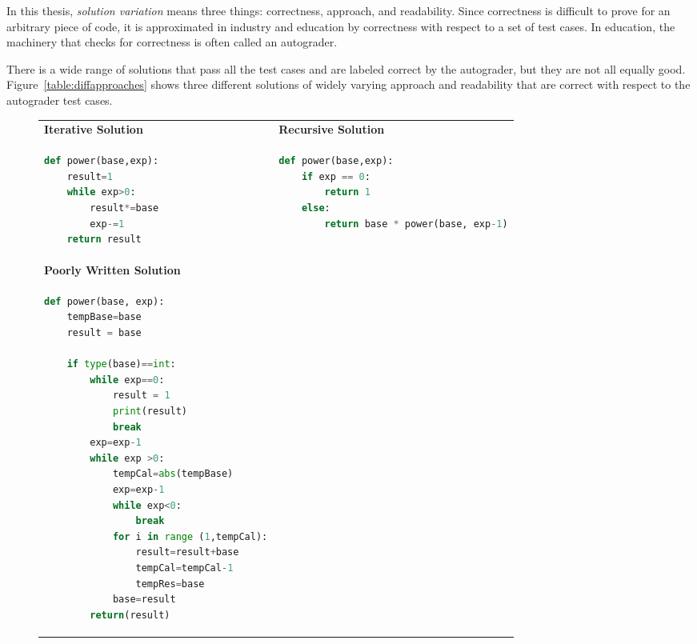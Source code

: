 In this thesis, {\it solution variation} means three things: correctness, approach, and readability. Since correctness is difficult to prove for an arbitrary piece of code, it is approximated in industry and education by correctness with respect to a set of test cases. In education, the machinery that checks for correctness is often called an autograder.

There is a wide range of solutions that pass all the test cases and are labeled correct by the autograder, but they are not all equally good. Figure~\ref{table:diffapproaches} shows three different solutions of widely varying approach and readability that are correct with respect to the autograder test cases.

\begin{figure}
\begin{tabular}{ll}
{\bf Iterative Solution} & {\bf Recursive Solution} \\
\begin{minipage}{0.5\linewidth}
\begin{lstlisting}[basicstyle=\linespread{1.0}\ttfamily\footnotesize,language=python]
def power(base,exp):
    result=1
    while exp>0:
        result*=base
        exp-=1
    return result
\end{lstlisting}
\end{minipage}
&
\begin{minipage}{0.5\linewidth}
\begin{lstlisting}[basicstyle=\linespread{1.0}\ttfamily\footnotesize,language=python]
def power(base,exp):
    if exp == 0:
        return 1
    else:
        return base * power(base, exp-1)
\end{lstlisting}
\end{minipage} \\

{\bf Poorly Written Solution} & \\
\begin{minipage}{0.5\linewidth}
\begin{lstlisting}[basicstyle=\linespread{1.0}\ttfamily\footnotesize,language=python]
def power(base, exp):
    tempBase=base
    result = base

    if type(base)==int:
        while exp==0:
            result = 1
            print(result)
            break
        exp=exp-1
        while exp >0:
            tempCal=abs(tempBase)
            exp=exp-1
            while exp<0:
                break
            for i in range (1,tempCal):
                result=result+base
                tempCal=tempCal-1
                tempRes=base
            base=result
        return(result)


\end{lstlisting}
\end{minipage}
\end{tabular}
\end{figure}
